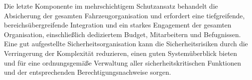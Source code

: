 Die letzte Komponente im mehrschichtigem Schutzansatz behandelt die Absicherung 
der gesamten Fahrzeugorganisation und erfordert eine tiefgreifende, bereichsübergreifende 
Integration und ein starkes Engagement der gesamten Organisation, einschließlich 
dediziertem Budget, Mitarbeitern und Befugnissen. 
\newline
Eine gut aufgestellte Sicherheitsorganisation kann die Sicherheitsrisiken durch die 
Verringerung der Komplexität reduzieren, einen guten Systemüberblick bieten und für 
eine ordnungsgemäße Verwaltung aller sicherheitskritischen Funktionen und der 
entsprechenden Berechtigungsnachweise sorgen. 
